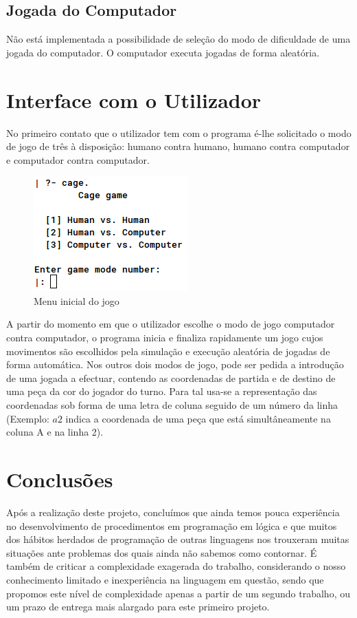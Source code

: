 \documentclass[a4paper]{article}
\begin{document}
\subsection{Jogada do Computador}
Não está implementada a possibilidade de seleção do modo de dificuldade de uma jogada do computador. O computador executa jogadas de forma aleatória.

\section{Interface com o Utilizador}
No primeiro contato que o utilizador tem com o programa é-lhe solicitado o modo de jogo de três à disposição: humano contra humano, humano contra computador e computador contra computador.

\begin{figure}[H]
    \center
    \includegraphics[scale=0.6]{resources/main-menu.png}
    \caption{Menu inicial do jogo}
    \label{fig:main-menu.png}
\end{figure}

A partir do momento em que o utilizador escolhe o modo de jogo computador contra computador, o programa inicia e finaliza rapidamente um jogo cujos movimentos são escolhidos pela simulação e execução aleatória de jogadas de forma automática. Nos outros dois modos de jogo, pode ser pedida a introdução de uma jogada a efectuar, contendo as coordenadas de partida e de destino de uma peça da cor do jogador do turno. Para tal usa-se a representação das coordenadas sob forma de uma letra de coluna seguido de um número da linha (Exemplo: $a2$ indica a coordenada de uma peça que está simultâneamente na coluna A e na linha 2). 

\section{Conclusões}
Após a realização deste projeto, concluímos que ainda temos pouca experiência no desenvolvimento de procedimentos em programação em lógica e que muitos dos hábitos herdados de programação de outras linguagens nos trouxeram muitas situações ante problemas dos quais ainda não sabemos como contornar. É também de criticar a complexidade exagerada do trabalho, considerando o nosso conhecimento limitado e inexperiência na linguagem em questão, sendo que propomos este nível de complexidade apenas a partir de um segundo trabalho, ou um prazo de entrega mais alargado para este primeiro projeto.
\end{document}
